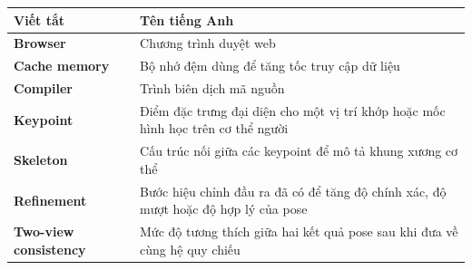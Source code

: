 \documentclass[../DoAn.tex]{subfiles}
\begin{document}
\begin{longtable}{p{4.0cm} p{10.0cm}}
	\hline
   \textbf{Viết tắt}  & \textbf{Tên tiếng Anh} \\ \hline 
	\textbf{Browser} & Chương trình duyệt web \\
	\textbf{Cache memory} & Bộ nhớ đệm dùng để tăng tốc truy cập dữ liệu \\
    \textbf{Compiler}  &  Trình biên dịch mã nguồn \\
    \textbf{Keypoint} & Điểm đặc trưng đại diện cho một vị trí khớp hoặc mốc hình học trên cơ thể người \\
    \textbf{Skeleton} & Cấu trúc nối giữa các keypoint để mô tả khung xương cơ thể \\
    \textbf{Refinement} & Bước hiệu chỉnh đầu ra đã có để tăng độ chính xác, độ mượt hoặc độ hợp lý của pose \\
    \textbf{Two-view consistency} & Mức độ tương thích giữa hai kết quả pose sau khi đưa về cùng hệ quy chiếu \\

    \hline
\end{longtable}
\end{document}
